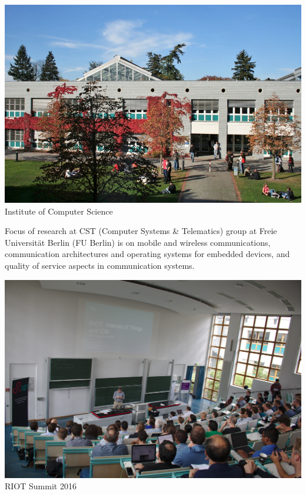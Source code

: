 \documentclass[a0,portrait,posterdraft]{a0poster}
\begin{document}
\begin{mybox2}
\begin{minipage}{.17\linewidth} \small \centering
\includegraphics[width=.9\textwidth]{./inf_930} \\
{Institute of Computer Science}
\end{minipage}
\hfill
\begin{minipage}{.60\linewidth} \Large
Focus of research at CST (Computer Systems \& Telematics) group at Freie
Universit\"at Berlin (FU Berlin) is on mobile and wireless communications,
communication architectures and operating systems for embedded devices, and
quality of service aspects in communication systems.\par
\end{minipage}
\hfill
\begin{minipage}{.17\linewidth} \small \centering
\includegraphics[width=.9\textwidth]{./IMG_0087} \\
{RIOT Summit 2016}
\end{minipage}
\end{mybox2}
\end{document}
